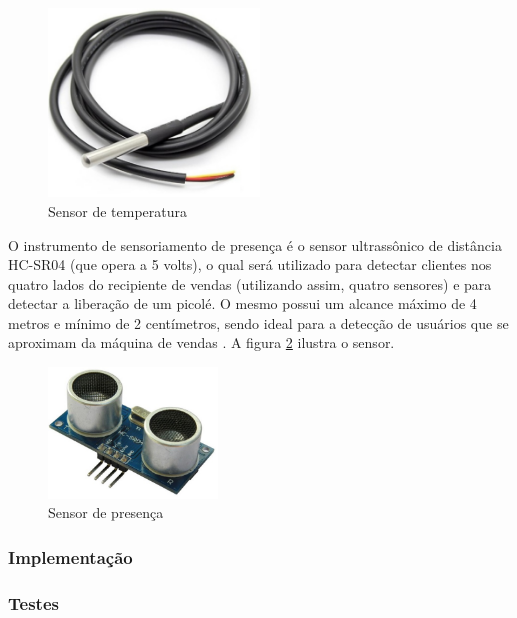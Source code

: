 \begin{figure}[H]
	\centering
    \includegraphics[width=0.5\textwidth]{figuras/sensor_temperatura}
    \caption{Sensor de temperatura}
    \label{fig:sensor_temperatura}
\end{figure}

O instrumento de sensoriamento de presença é o sensor ultrassônico de distância HC-SR04 (que opera a 5 volts), o qual será utilizado para detectar clientes nos quatro lados do recipiente de vendas (utilizando assim, quatro sensores) e para detectar a liberação de um picolé. O mesmo possui um alcance máximo de 4 metros e mínimo de 2 centímetros, sendo ideal para a detecção de usuários que se aproximam da máquina de vendas \cite{mq3}. A figura \ref{fig:sensor_presenca} ilustra o sensor.

\begin{figure}[H]
	\centering
    \includegraphics[width=0.4\textwidth]{figuras/sensor_presenca}
    \caption{Sensor de presença}
    \label{fig:sensor_presenca}
\end{figure}

\subsubsection{Implementação}

\subsubsection{Testes}

